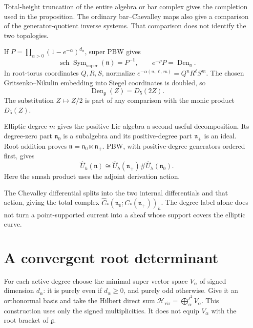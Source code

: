 Total-height truncation of the entire algebra or bar complex gives
the completion used in the proposition.
The ordinary bar--Chevalley maps also give a comparison of the
generator-quotient inverse systems. That comparison does not
identify the two topologies.

If \(P=\prod_{\alpha>0}(1-e^{-\alpha})^{d_\alpha}\), super PBW gives
\[
 \operatorname{sch}\operatorname{Sym}_{\mathrm{super}}(\mathfrak n)=P^{-1},
 \qquad e^{-\rho}P=\operatorname{Den}_{\mathfrak g}.
\]
In root-torus coordinates \(Q,R,S\), normalize
\(e^{-\alpha(n,\ell,m)}=Q^nR^\ell S^m\).
The chosen Gritsenko--Nikulin embedding into Siegel coordinates
is doubled, so
\[
 \operatorname{Den}_{\mathfrak g}(Z)=D_5(2Z).
\]
The substitution \(Z\mapsto Z/2\) is part of any comparison with
the monic product \(D_5(Z)\).

Elliptic degree \(m\) gives the positive Lie algebra a second
useful decomposition. Its degree-zero part \(\mathfrak n_0\)
is a subalgebra and its positive-degree part \(\mathfrak n_+\)
is an ideal. Root addition proves
\(\mathfrak n=\mathfrak n_0\ltimes\mathfrak n_+\).
PBW, with positive-degree generators ordered first, gives
\[
 \widehat U_h(\mathfrak n)
   \cong\widehat U_h(\mathfrak n_+)\#
                         \widehat U_h(\mathfrak n_0).
\]
Here the smash product uses the adjoint derivation action.

The Chevalley differential splits into the two internal
differentials and that action, giving the total complex
\(\widehat C_*(\mathfrak n_0;C_*(\mathfrak n_+))_h\).
The degree label alone does not turn a point-supported current
into a sheaf whose support covers the elliptic curve.

\section{A convergent root determinant}

For each active degree choose the minimal super vector space
\(V_\alpha\) of signed dimension \(d_\alpha\): it is purely even
if \(d_\alpha\geq0\), and purely odd otherwise.
Give it an orthonormal basis and take the Hilbert direct sum
\(\mathcal H_{\mathrm{vir}}=\bigoplus_\alpha^{\ell^2}V_\alpha\).
This construction uses only the signed multiplicities.
It does not equip \(V_\alpha\) with the root bracket of
\(\mathfrak g\).

